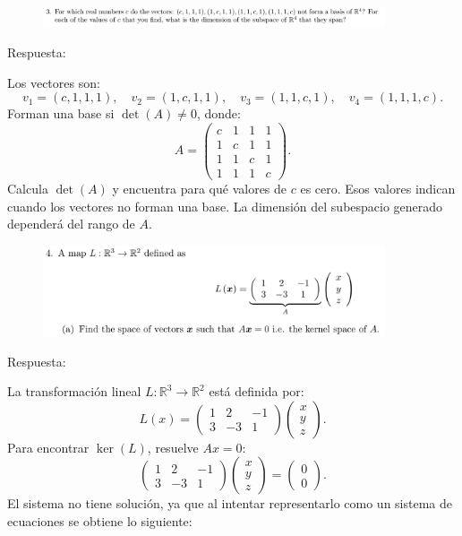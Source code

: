 \documentclass[12pt]{report}
\begin{document}
\begin{figure}[H]
	\centering
	\includegraphics[width=0.9\textwidth]{inciso3}
\end{figure}
	Respuesta:
	
	
	Los vectores son:
	\[
	v_1 = (c, 1, 1, 1), \quad v_2 = (1, c, 1, 1), \quad v_3 = (1, 1, c, 1), \quad v_4 = (1, 1, 1, c).
	\]
	Forman una base si \( \det(A) \neq 0 \), donde:
	\[
	A = \begin{pmatrix}
		c & 1 & 1 & 1 \\
		1 & c & 1 & 1 \\
		1 & 1 & c & 1 \\
		1 & 1 & 1 & c
	\end{pmatrix}.
	\]
	Calcula \( \det(A) \) y encuentra para qué valores de \( c \) es cero. Esos valores indican cuando los vectores no forman una base. La dimensión del subespacio generado dependerá del rango de \( A \).
	
	
	
\begin{figure}[H]
	\centering
	\includegraphics[width=0.9\textwidth]{inciso4}
\end{figure}
Respuesta:


La transformación lineal \( L : \mathbb{R}^3 \to \mathbb{R}^2 \) está definida por:
\[
L(x) = \begin{pmatrix}
	1 & 2 & -1 \\
	3 & -3 & 1
\end{pmatrix} \begin{pmatrix}
	x \\
	y \\
	z
\end{pmatrix}.
\]
Para encontrar \( \ker(L) \), resuelve \( Ax = 0 \):
\[
\begin{pmatrix}
	1 & 2 & -1 \\
	3 & -3 & 1
\end{pmatrix} \begin{pmatrix}
	x \\
	y \\
	z
\end{pmatrix} = \begin{pmatrix}
	0 \\
	0
\end{pmatrix}.
\]
El sistema no tiene solución, ya que al intentar representarlo como un sistema de ecuaciones se obtiene lo siguiente:
\end{document}

